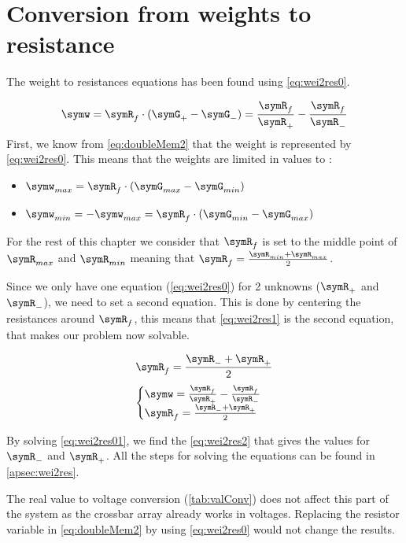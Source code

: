 \section{Conversion from weights to resistance}
\label{sec:wei2res}

The weight to resistances equations has been found using \cref{eq:wei2res0}.

\begin{equation}
  \label{eq:wei2res0}
  \symw=\symR_f\cdot( \symG_+- \symG_-)=\frac{\symR_f}{\symR_+}-\frac{\symR_f}{\symR_-}
\end{equation}
First, we know from \cref{eq:doubleMem2} that the weight is represented by \cref{eq:wei2res0}. This means that the weights are limited in values to :

\begin{itemize}
  \item $\symw_{max}=\symR_f\cdot( \symG_{max}- \symG_{min})$
  \item $\symw_{min}=-\symw_{max}=\symR_f\cdot( \symG_{min}- \symG_{max})$
\end{itemize}

For the rest of this chapter we consider that $\symR_f$ is set to the middle point of $\symR_{max}$ and $\symR_{min}$ meaning that $\symR_f=\frac{\symR_{min}+\symR_{max}}{2}$.

Since we only have one equation (\cref{eq:wei2res0}) for 2 unknowns ($\symR_+$ and $\symR_-$), we need to set a second equation. This is done by centering the resistances around $\symR_f$, this means that \cref{eq:wei2res1} is the second equation, that makes our problem now solvable.

\begin{equation}
  \label{eq:wei2res1}
  \symR_f=\frac{\symR_-+\symR_+}{2}
\end{equation}
\begin{equation}
  \label{eq:wei2res01}
  \begin{cases}
    \symw=\frac{\symR_f}{\symR_+}-\frac{\symR_f}{\symR_-}\\
    \symR_f=\frac{\symR_-+\symR_+}{2}
  \end{cases}
\end{equation}

By solving \cref{eq:wei2res01}, we find the \cref{eq:wei2res2} that gives the values for $\symR_-$ and $\symR_+$. All the steps for solving the equations can be found in \cref{apsec:wei2res}.

The real value to voltage conversion (\cref{tab:valConv}) does not affect this part of the system as the crossbar array already works in voltages. Replacing the resistor variable in \cref{eq:doubleMem2} by \symw using \cref{eq:wei2res0} would not change the results.

